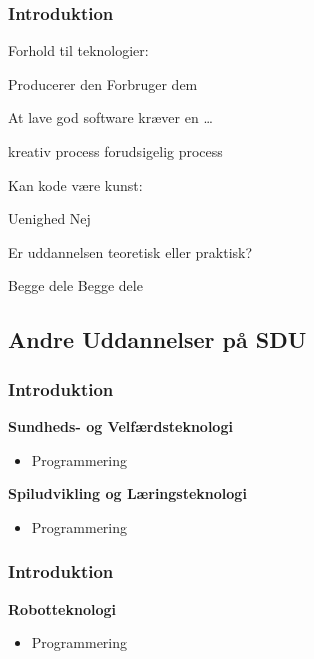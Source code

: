 {\begin{frame}[fragile]
  \frametitle{Introduktion }
  \vspace{-1mm}
  Forhold til teknologier:
  \begin{itemize}
     Producerer den
     Forbruger dem
  \end{itemize}
  
  \pause
  \vspace{2mm}
  At lave god software kræver en \ldots
  \begin{itemize}
     kreativ process
     forudsigelig process
  \end{itemize}
  
  \pause
  \vspace{2mm}
  Kan kode være kunst:
  \begin{itemize}
     Uenighed
     Nej
  \end{itemize}
  
  \pause
  \vspace{2mm}
  Er uddannelsen teoretisk eller praktisk?
  \begin{itemize}
     Begge dele
     Begge dele
  \end{itemize}
\end{frame}

\subsection{Andre Uddannelser på SDU}
\begin{frame}[fragile]
  \frametitle{Introduktion }
  \vspace{7mm}
  \textbf{Sundheds- og Velfærdsteknologi}
  \begin{itemize}
     BSc og MSc
     Anatomi, Bevægelse, Fysiologi, Medicinsk udstyr
    \item Programmering
  \end{itemize}
  
  \pause
  \vspace{9mm}
  \textbf{Spiludvikling og Læringsteknologi}
  \begin{itemize}
     BSc \textcolor{purple}{(og MSc via Software Engineering)}
     Læringsteori, Spilprogrammering, Virtual \& Augmented Reality, Robotik, Historiefortælling
    \item Programmering
  \end{itemize}
\end{frame}
\begin{frame}[fragile]
  \frametitle{Introduktion }
  \vspace{7mm}
  \textbf{Robotteknologi}
  \begin{itemize}
     BSc (både diplom og civil) og MSc
     Mekanik, Elektronik, Kinematik, Radio
    \item Programmering
  \end{itemize}
  

\end{frame}}
